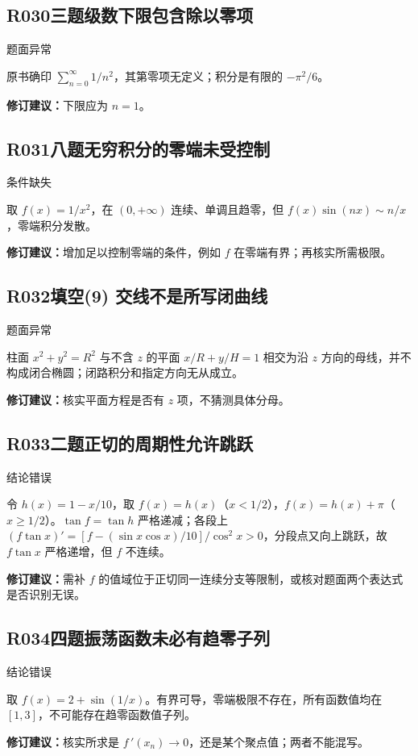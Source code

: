 \subsection*{R030\quad 三题级数下限包含除以零项}
\noindent{}\quad 题面异常\par
原书确印 $\sum_{n=0}^{\infty}1/n^2$，其第零项无定义；积分是有限的 $-\pi^2/6$。
\par\textbf{修订建议：}下限应为 $n=1$。\par
{}
\subsection*{R031\quad 八题无穷积分的零端未受控制}
\noindent{}\quad 条件缺失\par
取 $f(x)=1/x^2$，在 $(0,+\infty)$ 连续、单调且趋零，但 $f(x)\sin(nx)\sim n/x$，零端积分发散。
\par\textbf{修订建议：}增加足以控制零端的条件，例如 $f$ 在零端有界；再核实所需极限。\par
{}
\subsection*{R032\quad 填空(9) 交线不是所写闭曲线}
\noindent{}\quad 题面异常\par
柱面 $x^2+y^2=R^2$ 与不含 $z$ 的平面 $x/R+y/H=1$ 相交为沿 $z$ 方向的母线，并不构成闭合椭圆；闭路积分和指定方向无从成立。
\par\textbf{修订建议：}核实平面方程是否有 $z$ 项，不猜测具体分母。\par
{}
\subsection*{R033\quad 二题正切的周期性允许跳跃}
\noindent{}\quad 结论错误\par
令 $h(x)=1-x/10$，取 $f(x)=h(x)$（$x<1/2$），$f(x)=h(x)+\pi$（$x\ge1/2$）。$\tan f=\tan h$ 严格递减；各段上 $(f\tan x)'=[f-(\sin x\cos x)/10]/\cos^2x>0$，分段点又向上跳跃，故 $f\tan x$ 严格递增，但 $f$ 不连续。
\par\textbf{修订建议：}需补 $f$ 的值域位于正切同一连续分支等限制，或核对题面两个表达式是否识别无误。\par
{}
\subsection*{R034\quad 四题振荡函数未必有趋零子列}
\noindent{}\quad 结论错误\par
取 $f(x)=2+\sin(1/x)$。有界可导，零端极限不存在，所有函数值均在 $[1,3]$，不可能存在趋零函数值子列。
\par\textbf{修订建议：}核实所求是 $f\,\prime(x_n)\to0$，还是某个聚点值；两者不能混写。\par
{}
